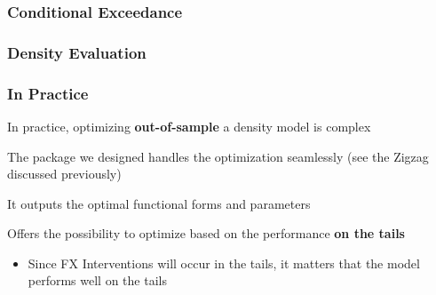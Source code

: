 \documentclass{beamer}
\newenvironment{wideitemize}{\itemize\addtolength{\itemsep}{10pt}}{\enditemize}
\begin{document}
\begin{frame}
  \frametitle{Conditional Exceedance}
\end{frame}

     
\begin{frame}
  \frametitle{Density Evaluation}
\end{frame}


\begin{frame}
  \frametitle{In Practice}
  \begin{wideitemize}
    \item In practice, optimizing \textbf{out-of-sample} a density model is complex
    \item The package we designed handles the optimization seamlessly (see the Zigzag discussed previously)
    \item It outputs the optimal functional forms and parameters
    \item Offers the possibility to optimize based on the performance \textbf{on the tails}
      \begin{itemize}
      \item Since FX Interventions will occur in the tails, it matters that the model performs well on the tails
      \end{itemize}
  \end{wideitemize}
\end{frame}
\end{document}
